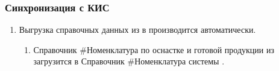 \subsubsection{Синхронизация с КИС}
\label{bp:pm_integration}

\begin{enumerate}
\item Выгрузка справочных данных из \erp в \gofro производится автоматически.
\begin{enumerate}
\item 	Справочник  \#Номенклатура по оснастке и готовой продукции из \gofro загрузится в Справочник  \#Номенклатура системы  \unf.

\end{enumerate}

 \end{enumerate}
